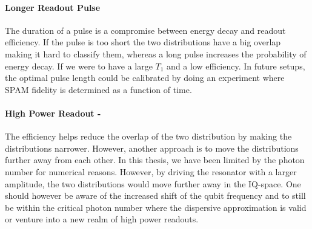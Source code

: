 \paragraph{Longer Readout Pulse} The duration of a pulse is a compromise between energy decay and readout efficiency. If the pulse is too short the two distributions have a big overlap making it hard to classify them, whereas a long pulse increases the probability of energy decay. If we were to have a large $T_1$ and a low efficiency. In future setups, the optimal pulse length could be calibrated by doing an experiment where SPAM fidelity is determined as a function of time. 

\paragraph{High Power Readout - } The efficiency helps reduce the overlap of the two distribution by making the distributions narrower. However, another approach is to move the distributions further away from each other. In this thesis, we have been limited by the photon number for numerical reasons. However, by driving the resonator with a larger amplitude, the two distributions would move further away in the IQ-space. One should however be aware of the increased shift of the qubit frequency and to still be within the critical photon number where the dispersive approximation is valid or venture into a new realm of high power readouts. 


